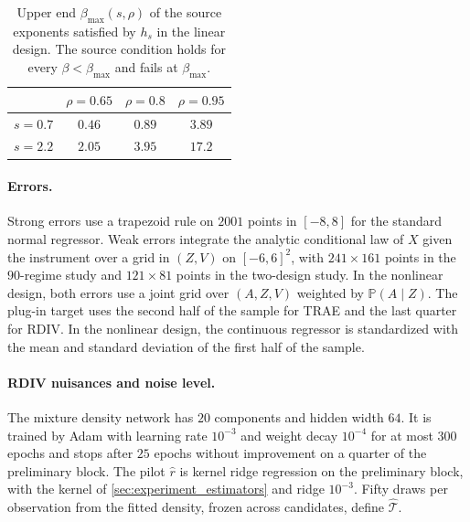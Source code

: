 \begin{table}[!htp]
\centering
\caption{Upper end $\beta_{\max}(s,\rho)$ of the source exponents satisfied by $h_s$ in the linear design. The source condition holds for every $\beta<\beta_{\max}$ and fails at $\beta_{\max}$.}
\label{tab:experiment_beta}
\begin{tabular}{lccc}
\toprule
 & $\rho=0.65$ & $\rho=0.8$ & $\rho=0.95$\\
\midrule
$s=0.7$ & $0.46$ & $0.89$ & $3.89$\\
$s=2.2$ & $2.05$ & $3.95$ & $17.2$\\
\bottomrule
\end{tabular}
\end{table}

\paragraph{Errors.}
Strong errors use a trapezoid rule on $2001$ points in $[-8,8]$ for the standard normal regressor. Weak errors integrate the analytic conditional law of $X$ given the instrument over a grid in $(Z,V)$ on $[-6,6]^2$, with $241\times161$ points in the $90$-regime study and $121\times81$ points in the two-design study. In the nonlinear design, both errors use a joint grid over $(A,Z,V)$ weighted by $\mathbb P(A\mid Z)$. The plug-in target uses the second half of the sample for TRAE and the last quarter for RDIV. In the nonlinear design, the continuous regressor is standardized with the mean and standard deviation of the first half of the sample.

\paragraph{RDIV nuisances and noise level.}
The mixture density network has $20$ components and hidden width $64$. It is trained by Adam with learning rate $10^{-3}$ and weight decay $10^{-4}$ for at most $300$ epochs and stops after $25$ epochs without improvement on a quarter of the preliminary block. The pilot $\hat r$ is kernel ridge regression on the preliminary block, with the kernel of \cref{sec:experiment_estimators} and ridge $10^{-3}$. Fifty draws per observation from the fitted density, frozen across candidates, define $\hat{\mathcal T}$.

